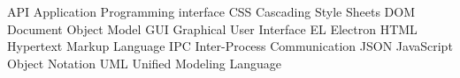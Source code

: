 
   {API}      {Application Programming interface}
    {CSS}       {Cascading Style Sheets}
    {DOM}       {Document Object Model}
    {GUI}       {Graphical User Interface}
     {EL}        {Electron}
   {HTML}      {Hypertext Markup Language}
   {IPC}      {Inter-Process Communication}
   {JSON}      {JavaScript Object Notation}
   {UML}      {Unified Modeling Language}